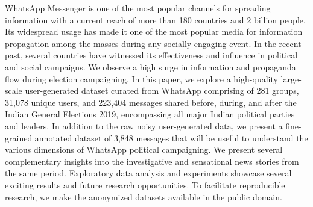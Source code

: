 WhatsApp Messenger is one of the most popular channels for spreading information with a current reach of more than 180 countries and 2 billion people. Its widespread usage has made it one of the most popular media for information propagation among the masses during any socially engaging event. In the recent past, several countries have witnessed its effectiveness and influence in political and social campaigns. We observe a high surge in information and propaganda flow during election campaigning. In this paper, we explore a high-quality large-scale user-generated dataset curated from WhatsApp comprising of 281 groups, 31,078 unique users, and 223,404 messages shared before, during, and after the Indian General Elections 2019, encompassing all major Indian political parties and leaders. In addition to the raw noisy user-generated data, we present a fine-grained annotated dataset of 3,848 messages that will be useful to understand the various dimensions of WhatsApp political campaigning. We present several complementary insights into the investigative and sensational news stories from the same period. Exploratory data analysis and experiments showcase several exciting results and future research opportunities. To facilitate reproducible research, we make the anonymized datasets available in the public domain.
